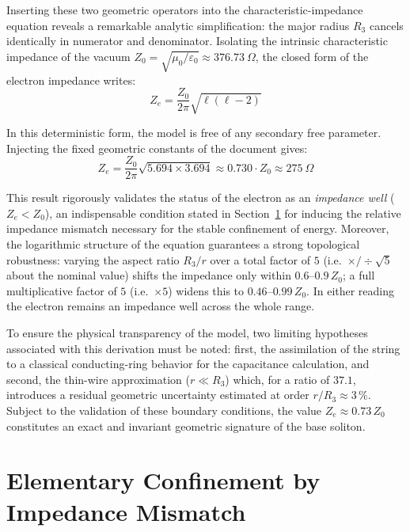 \documentclass[11pt,a4paper]{article}
\theoremstyle{plain}
\theoremstyle{remark}
\begin{document}
Inserting these two geometric operators into the characteristic-impedance equation reveals a remarkable analytic simplification: the major radius $R_3$ cancels identically in numerator and denominator. Isolating the intrinsic characteristic impedance of the vacuum $Z_0 = \sqrt{\mu_0/\varepsilon_0} \approx 376.73~\Omega$, the closed form of the electron impedance writes:
\begin{equation}
Z_e = \frac{Z_0}{2\pi} \sqrt{\ell(\ell - 2)}
\end{equation}

In this deterministic form, the model is free of any secondary free parameter. Injecting the fixed geometric constants of the document gives:
\begin{equation}
Z_e = \frac{Z_0}{2\pi} \sqrt{5.694 \times 3.694} \approx 0.730 \cdot Z_0 \approx 275~\Omega
\end{equation}

This result rigorously validates the status of the electron as an \textit{impedance well} ($Z_e < Z_0$), an indispensable condition stated in Section~\ref{sec:impedance_confinement} for inducing the relative impedance mismatch necessary for the stable confinement of energy. Moreover, the logarithmic structure of the equation guarantees a strong topological robustness: varying the aspect ratio $R_3/r$ over a total factor of $5$ (i.e.\ $\times/\!\div\sqrt5$ about the nominal value) shifts the impedance only within $0.6$--$0.9\,Z_0$; a full multiplicative factor of $5$ (i.e.\ $\times5$) widens this to $0.46$--$0.99\,Z_0$. In either reading the electron remains an impedance well across the whole range.

To ensure the physical transparency of the model, two limiting hypotheses associated with this derivation must be noted: first, the assimilation of the string to a classical conducting-ring behavior for the capacitance calculation, and second, the thin-wire approximation ($r \ll R_3$) which, for a ratio of $37.1$, introduces a residual geometric uncertainty estimated at order $r/R_3 \approx 3\,\%$. Subject to the validation of these boundary conditions, the value $Z_e \approx 0.73\,Z_0$ constitutes an exact and invariant geometric signature of the base soliton.

\section{Elementary Confinement by Impedance Mismatch}
\label{sec:impedance_confinement}
\end{document}
